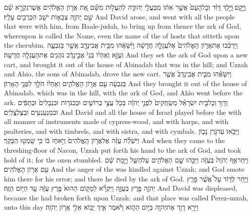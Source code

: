 {וַיָּ֣קׇם \legarmeh  וַיֵּ֣לֶךְ דָּוִ֗ד וְכׇל\maqqaf הָעָם֙ אֲשֶׁ֣ר אִתּ֔וֹ מִֽבַּעֲלֵ֖י יְהוּדָ֑ה לְהַעֲל֣וֹת מִשָּׁ֗ם אֵ֚ת אֲר֣וֹן הָאֱלֹהִ֔ים אֲשֶׁר\maqqaf נִקְרָ֣א שֵׁ֗ם שֵׁ֣ם יְהֹוָ֧ה צְבָא֛וֹת יֹשֵׁ֥ב הַכְּרֻבִ֖ים עָלָֽיו׃}
{And David arose, and went with all the people that were with him, from Baale-judah, to bring up from thence the ark of God, whereupon is called the Name, even the name of the \lord\space of hosts that sitteth upon the cherubim.}
{וַיַּרְכִּ֜בוּ אֶת\maqqaf אֲר֤וֹן הָאֱלֹהִים֙ אֶל\maqqaf עֲגָלָ֣ה חֲדָשָׁ֔ה וַיִּ֨שָּׂאֻ֔הוּ מִבֵּ֥ית אֲבִינָדָ֖ב אֲשֶׁ֣ר בַּגִּבְעָ֑ה וְעֻזָּ֣א וְאַחְי֗וֹ בְּנֵי֙ אֲבִ֣ינָדָ֔ב נֹהֲגִ֖ים אֶת\maqqaf הָעֲגָלָ֥ה חֲדָשָֽׁה׃}
{And they set the ark of God upon a new cart, and brought it out of the house of Abinadab that was in the hill; and Uzzah and Ahio, the sons of Abinadab, drove the new cart.}
{וַיִּשָּׂאֻ֗הוּ מִבֵּ֤ית אֲבִֽינָדָב֙ אֲשֶׁ֣ר בַּגִּבְעָ֔ה עִ֖ם אֲר֣וֹן הָאֱלֹהִ֑ים וְאַחְי֕וֹ הֹלֵ֖ךְ לִפְנֵ֥י הָאָרֽוֹן׃}
{And they brought it out of the house of Abinadab, which was in the hill, with the ark of God, and Ahio went before the ark.}
{וְדָוִ֣ד \legarmeh  וְכׇל\maqqaf בֵּ֣ית יִשְׂרָאֵ֗ל מְשַֽׂחֲקִים֙ לִפְנֵ֣י יְהֹוָ֔ה בְּכֹ֖ל עֲצֵ֣י בְרוֹשִׁ֑ים וּבְכִנֹּר֤וֹת וּבִנְבָלִים֙ וּבְתֻפִּ֔ים וּבִמְנַעַנְעִ֖ים וּֽבְצֶלְצֱלִֽים׃}
{And David and all the house of Israel played before the \lord\space with all manner of instruments made of cypress-wood, and with harps, and with psalteries, and with timbrels, and with sistra, and with cymbals.}
{וַיָּבֹ֖אוּ עַד\maqqaf גֹּ֣רֶן נָכ֑וֹן וַיִּשְׁלַ֨ח עֻזָּ֜ה אֶל\maqqaf אֲר֤וֹן הָֽאֱלֹהִים֙ וַיֹּ֣אחֶז בּ֔וֹ כִּ֥י שָֽׁמְט֖וּ הַבָּקָֽר׃}
{And when they came to the threshing-floor of Nacon, Uzzah put forth his hand to the ark of God, and took hold of it; for the oxen stumbled.}
{וַיִּֽחַר\maqqaf אַ֤ף יְהֹוָה֙ בְּעֻזָּ֔ה וַיַּכֵּ֥הוּ שָׁ֛ם הָאֱלֹהִ֖ים עַל\maqqaf הַשַּׁ֑ל וַיָּ֣מׇת שָׁ֔ם עִ֖ם אֲר֥וֹן הָאֱלֹהִֽים׃}
{And the anger of the \lord\space was kindled against Uzzah; and God smote him there for his error; and there he died by the ark of God.}
{וַיִּ֣חַר לְדָוִ֔ד עַל֩ אֲשֶׁ֨ר פָּרַ֧ץ יְהֹוָ֛ה פֶּ֖רֶץ בְּעֻזָּ֑ה וַיִּקְרָ֞א לַמָּק֤וֹם הַהוּא֙ פֶּ֣רֶץ עֻזָּ֔ה עַ֖ד הַיּ֥וֹם הַזֶּֽה׃}
{And David was displeased, because the \lord\space had broken forth upon Uzzah; and that place was called Perez-uzzah, unto this day}
{וַיִּרָ֥א דָוִ֛ד אֶת\maqqaf יְהֹוָ֖ה בַּיּ֣וֹם הַה֑וּא וַיֹּ֕אמֶר אֵ֛יךְ יָב֥וֹא אֵלַ֖י אֲר֥וֹן יְהֹוָֽה׃}
